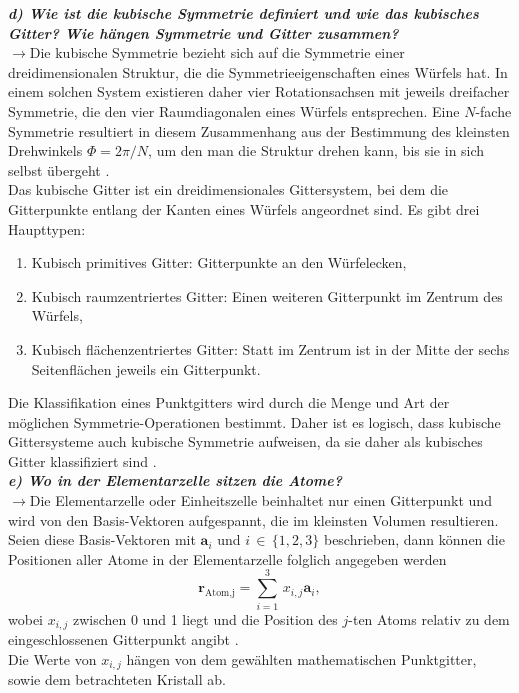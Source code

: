 \textbf{\textit{d) Wie ist die kubische Symmetrie definiert und wie das kubisches Gitter? 
Wie hängen Symmetrie und Gitter zusammen?}}\\
$\rightarrow$Die kubische Symmetrie bezieht sich auf die Symmetrie einer dreidimensionalen Struktur, 
die die Symmetrieeigenschaften eines Würfels hat. In einem solchen System existieren daher vier Rotationsachsen 
mit jeweils dreifacher Symmetrie, die den vier Raumdiagonalen eines Würfels entsprechen. Eine 
$N$-fache Symmetrie resultiert in diesem Zusammenhang aus der Bestimmung des kleinsten Drehwinkels $\Phi=2\pi/N$, 
um den man die Struktur drehen kann, bis sie in sich selbst übergeht \cite{EPC}. \\
Das kubische Gitter ist ein dreidimensionales Gittersystem, bei dem die Gitterpunkte entlang der 
Kanten eines Würfels angeordnet sind. Es gibt drei Haupttypen:
\begin{enumerate}
    \item Kubisch primitives Gitter: Gitterpunkte an den Würfelecken,
    \item Kubisch raumzentriertes Gitter: Einen weiteren Gitterpunkt im Zentrum des Würfels,
    \item Kubisch flächenzentriertes Gitter: Statt im Zentrum ist in der Mitte der sechs Seitenflächen jeweils ein Gitterpunkt.
\end{enumerate}
Die Klassifikation eines Punktgitters wird durch die Menge und Art der möglichen Symmetrie-Operationen bestimmt. 
Daher ist es logisch, dass kubische Gittersysteme auch kubische Symmetrie aufweisen, da sie daher als kubisches Gitter 
klassifiziert sind \cite{EPC}. \\

\textbf{\textit{e) Wo in der Elementarzelle sitzen die Atome?}}\\
$\rightarrow$Die Elementarzelle oder Einheitszelle beinhaltet nur einen Gitterpunkt und wird von den 
Basis-Vektoren aufgespannt, die im kleinsten Volumen resultieren. Seien diese Basis-Vektoren 
mit $\mathbf{a}_{i}$ und $i\,\in\,\{1,2,3\}$ beschrieben, dann können die Positionen 
aller Atome in der Elementarzelle folglich angegeben werden
\begin{equation}
    \mathbf{r}_{\text{Atom,j}} = \sum_{i=1}^{3}\,x_{i,j}\mathbf{a}_{i}, 
\end{equation}
wobei $x_{i,j}$ zwischen 0 und 1 liegt und die Position des $j$-ten Atoms relativ zu dem eingeschlossenen Gitterpunkt 
angibt \cite{EPC}. \\ 
Die Werte von $x_{i,j}$ hängen von dem gewählten mathematischen Punktgitter, sowie dem betrachteten Kristall ab.